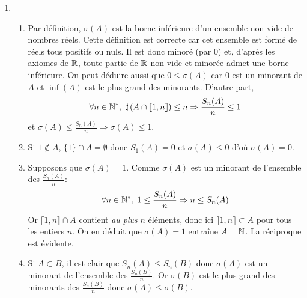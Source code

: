 \begin{enumerate}
\item \begin{enumerate}
  \item Par définition, $\sigma (A)$ est la borne inférieure d'un ensemble non vide de nombres réels. Cette définition est correcte car cet ensemble est formé de réels tous positifs ou nuls. Il est donc minoré (par $0$) et, d'après les axiomes de $\mathbb{R}$, toute partie de $\mathbb{R}$ non vide et minorée admet une borne inférieure. On peut déduire aussi que $0\leq \sigma(A)$ car $0$ est un minorant de $A$ et $\inf(A)$ est le plus grand des minorants. D'autre part, 
\[
 \forall n \in \mathbb{N}^*, \; \sharp\left( A \cap \llbracket 1,n \rrbracket\right) \leq n \Rightarrow \frac{S_n(A)}{n} \leq 1 
\]
et  $\sigma(A)\leq \frac{S_n(A)}{n} \Rightarrow \sigma(A) \leq 1$.
  
  \item Si $1\not \in A$, $\{1\}\cap A= \emptyset$ donc $S_1(A)=0$ et $\sigma (A)\leq 0$ d'où $\sigma(A)=0$.
  
  \item Supposons que $\sigma (A)=1$. Comme $\sigma (A)$ est un minorant de l'ensemble des $\frac{S_n(A)}{n}$:
\begin{displaymath}
\forall n\in \mathbb{N}^*, \;   1\leq \frac{S_n(A)}{n} \Rightarrow n\leq S_n(A)
\end{displaymath}
Or $\llbracket 1,n  \rrbracket\cap A$ contient \emph{au plus} $n$ éléments, donc ici $\llbracket 1,n  \rrbracket\subset A$ pour tous les entiers $n$. On en déduit que $\sigma (A)=1$ entraîne $A=\mathbb{N}$. La réciproque est évidente.
  \item Si $A \subset B$, il est clair que $S_n(A)\leq S_n(B)$ donc $\sigma (A)$ est un minorant de l'ensemble des $\frac{S_n(B)}{n}$. Or $\sigma (B)$ est le plus grand des minorants des $\frac{S_n(B)}{n}$ donc $\sigma(A) \leq \sigma(B)$.
\end{enumerate}


\end{enumerate}
